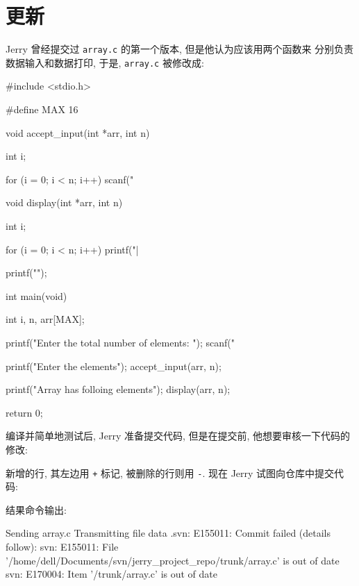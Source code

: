 \documentclass[nofonts, oneside]{ctexart}
\newcommand\svn{\texttt{svn}}
\newcommand\svnci{\texttt{commit}}
\newcommand\svndf{\texttt{diff}}
\begin{document}
\section{更新}
\label{sec:update_process}

Jerry 曾经提交过 \texttt{array.c} 的第一个版本, 但是他认为应该用两个函数来
分别负责数据输入和数据打印, 于是, \texttt{array.c} 被修改成:
\begin{ccode}
#include <stdio.h>

#define MAX 16

void accept_input(int *arr, int n)
{
	int i;

	for (i = 0; i < n; i++)
		scanf("%
}

void display(int *arr, int n)
{
	int i;

	for (i = 0; i < n; i++)
		printf("|%

	printf("\n");
}

int main(void)
{
	int i, n, arr[MAX];

	printf("Enter the total number of elements: ");
	scanf("%

	printf("Enter the elements\n");
	accept_input(arr, n);

	printf("Array has folloing elements\n");
	display(arr, n);

	return 0;
}
\end{ccode}

编译并简单地测试后, Jerry 准备提交代码, 但是在提交前, 他想要审核一下代码的
修改:
新增的行, 其左边用 \texttt{+} 标记, 被删除的行则用 \texttt{-}. 现在 Jerry
试图向仓库中提交代码:
结果命令输出:
\begin{svnshell}
Sending        array.c
Transmitting file data .svn: E155011: Commit failed (details follow):
svn: E155011: File '/home/dell/Documents/svn/jerry_project_repo/trunk/array.c' is out of date
svn: E170004: Item '/trunk/array.c' is out of date
\end{svnshell}
\end{document}
